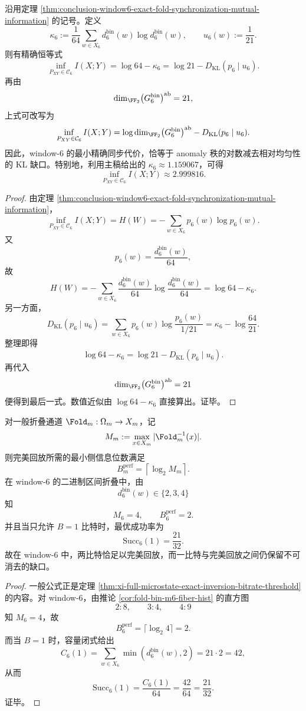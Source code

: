 \begin{corollary}\label{cor:conclusion-window6-synchronization-entropy-kl-anomaly-identity}
沿用定理 \ref{thm:conclusion-window6-exact-fold-synchronization-mutual-information} 的记号。定义
\[
\kappa_6:=\frac{1}{64}\sum_{w\in X_6}d_6^{\mathrm{bin}}(w)\log d_6^{\mathrm{bin}}(w),
\qquad
u_6(w):=\frac{1}{21}.
\]
则有精确恒等式
\[
\inf_{P_{XY}\in\mathcal C_6} I(X;Y)
=
\log 64-\kappa_6
=
\log 21-D_{\mathrm{KL}}(p_6\mid u_6).
\]
再由
\[
\dim_{\FF_2}\bigl(G_6^{\mathrm{bin}}\bigr)^{\mathrm{ab}}=21,
\]
上式可改写为
\[
\inf_{P_{XY}\in\mathcal C_6} I(X;Y)
=
\log \dim_{\FF_2}\bigl(G_6^{\mathrm{bin}}\bigr)^{\mathrm{ab}}
-D_{\mathrm{KL}}(p_6\mid u_6).
\]
因此，window-\(6\) 的最小精确同步代价，恰等于 anomaly 秩的对数减去相对均匀性的 KL 缺口。特别地，利用主稿给出的 \(\kappa_6\approx 1.159067\)，可得
\[
\inf_{P_{XY}\in\mathcal C_6} I(X;Y)\approx 2.999816.
\]
\end{corollary}
\begin{proof}
由定理 \ref{thm:conclusion-window6-exact-fold-synchronization-mutual-information}，
\[
\inf_{P_{XY}\in\mathcal C_6} I(X;Y)=H(W)
=
-\sum_{w\in X_6}p_6(w)\log p_6(w).
\]
又
\[
p_6(w)=\frac{d_6^{\mathrm{bin}}(w)}{64},
\]
故
\[
H(W)
=
-\sum_{w\in X_6}\frac{d_6^{\mathrm{bin}}(w)}{64}
\log\frac{d_6^{\mathrm{bin}}(w)}{64}
=
\log 64-\kappa_6.
\]
另一方面，
\[
D_{\mathrm{KL}}(p_6\mid u_6)
=
\sum_{w\in X_6}p_6(w)\log\frac{p_6(w)}{1/21}
=
\kappa_6-\log\frac{64}{21}.
\]
整理即得
\[
\log 64-\kappa_6=\log 21-D_{\mathrm{KL}}(p_6\mid u_6).
\]
再代入
\[
\dim_{\FF_2}\bigl(G_6^{\mathrm{bin}}\bigr)^{\mathrm{ab}}=21
\]
便得到最后一式。数值近似由 \(\log 64-\kappa_6\) 直接算出。证毕。
\end{proof}

\begin{theorem}\label{thm:conclusion-window6-perfect-replay-threshold-onebit-gap}
对一般折叠通道 \(\Fold_m:\Omega_m\to X_m\)，记
\[
M_m:=\max_{x\in X_m}|\Fold_m^{-1}(x)|.
\]
则完美回放所需的最小侧信息位数满足
\[
B_m^{\mathrm{perf}}=\left\lceil \log_2 M_m\right\rceil.
\]
在 window-\(6\) 的二进制区间折叠中，由
\[
d_6^{\mathrm{bin}}(w)\in\{2,3,4\}
\]
知
\[
M_6=4,
\qquad
B_6^{\mathrm{perf}}=2.
\]
并且当只允许 \(B=1\) 比特时，最优成功率为
\[
\mathrm{Succ}_6(1)=\frac{21}{32}.
\]
故在 window-\(6\) 中，两比特恰足以完美回放，而一比特与完美回放之间仍保留不可消去的缺口。
\end{theorem}
\begin{proof}
一般公式正是定理 \ref{thm:xi-full-microstate-exact-inversion-bitrate-threshold} 的内容。对 window-\(6\)，由推论 \ref{cor:fold-bin-m6-fiber-hist} 的直方图
\[
2:8,\qquad 3:4,\qquad 4:9
\]
知 \(M_6=4\)，故
\[
B_6^{\mathrm{perf}}=\lceil \log_2 4\rceil=2.
\]
而当 \(B=1\) 时，容量闭式给出
\[
C_6(1)=\sum_{w\in X_6}\min(d_6^{\mathrm{bin}}(w),2)=21\cdot 2=42,
\]
从而
\[
\mathrm{Succ}_6(1)=\frac{C_6(1)}{64}=\frac{42}{64}=\frac{21}{32}.
\]
证毕。
\end{proof}

